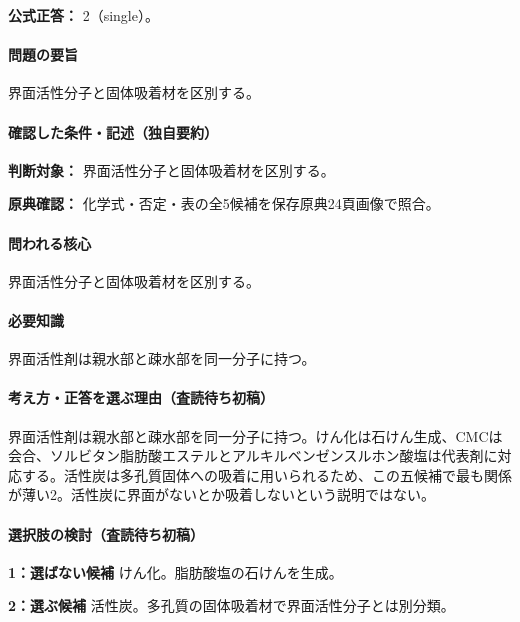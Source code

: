 \textbf{公式正答：} 2（single）。

\paragraph{問題の要旨} 界面活性分子と固体吸着材を区別する。

\paragraph{確認した条件・記述（独自要約）}\mbox{}\par

\noindent\textbf{判断対象：} 界面活性分子と固体吸着材を区別する。\par

\noindent\textbf{原典確認：} 化学式・否定・表の全5候補を保存原典24頁画像で照合。\par

\paragraph{問われる核心} 界面活性分子と固体吸着材を区別する。

\paragraph{必要知識} 界面活性剤は親水部と疎水部を同一分子に持つ。

\paragraph{考え方・正答を選ぶ理由（査読待ち初稿）} 界面活性剤は親水部と疎水部を同一分子に持つ。けん化は石けん生成、CMCは会合、ソルビタン脂肪酸エステルとアルキルベンゼンスルホン酸塩は代表剤に対応する。活性炭は多孔質固体への吸着に用いられるため、この五候補で最も関係が薄い2。活性炭に界面がないとか吸着しないという説明ではない。

\paragraph{選択肢の検討（査読待ち初稿）}\mbox{}\par

\noindent\textbf{1：選ばない候補} けん化。脂肪酸塩の石けんを生成。\par

\noindent\textbf{2：選ぶ候補} 活性炭。多孔質の固体吸着材で界面活性分子とは別分類。\par

